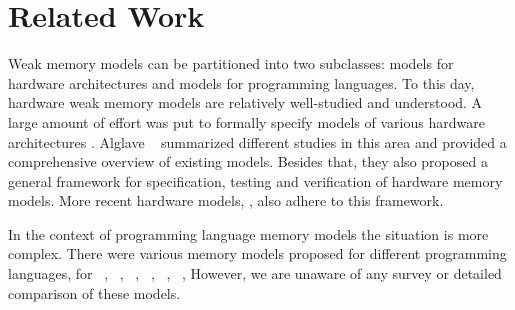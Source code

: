 \section{Related Work}
\label{sec:related}

Weak memory models can be partitioned into two subclasses: 
models for hardware architectures and models for programming languages. 
To this day, hardware weak memory models are relatively well-studied and understood.
A large amount of effort was put to formally specify models of various 
hardware architectures%
\cite{Chong-ASPLOS08, Alglave-DAMP09, Sewell-al:CACM10, Sarkar-al:PLDI11}.
Alglave \etal~\cite{Alglave-al:TOPLAS14} summarized different studies in this area 
and provided a comprehensive overview of existing models.  
Besides that, they also proposed a general framework for specification, 
testing and verification of hardware memory models.
More recent hardware models, \eg \cite{Pulte-al:POPL18}, 
also adhere to this framework.   

In the context of programming language memory models the situation is more complex. 
There were various memory models proposed for different programming languages, \eg
for \Java~\cite{Manson-al:POPL05, Bender-Palsberg:OOPSLA19}, \CPP~\cite{Batty-al:POPL11}, 
\LLVM~\cite{Chakraborty-Vafeiadis:CGO17}, \JS~\cite{Watt-al:PLDI2020}, 
\OCaml~\cite{Manson-al:POPL05}, \Haskell~\cite{Vollmer-al:PPoPP17}, \etc 
However, we are unaware of any survey or detailed comparison of these models.

